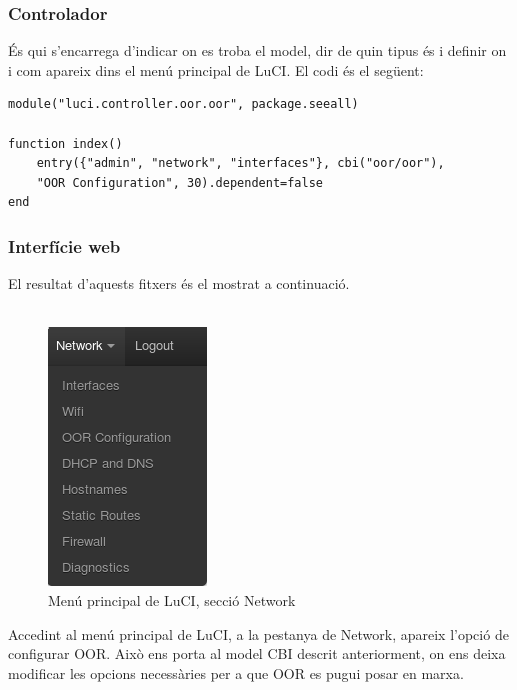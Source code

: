 \documentclass[11pt]{article}
\begin{document}
\subsubsection{Controlador}
És qui s’encarrega d’indicar on es troba el model, dir de quin tipus és i definir on i com apareix dins el menú principal de LuCI. El codi és el següent:\\
\lstset{caption=Controlador de la interfície LuCI}
\begin{lstlisting}[frame=single]
module("luci.controller.oor.oor", package.seeall)

function index()
    entry({"admin", "network", "interfaces"}, cbi("oor/oor"),
	"OOR Configuration", 30).dependent=false
end
\end{lstlisting}
\newpage
\subsubsection{Interfície web}
El resultat d’aquests fitxers és el mostrat a continuació. \\
\\
	\begin{figure}[h]
		\centering
		\includegraphics[scale=0.75]{luci1}
		\caption{Menú principal de LuCI, secció Network}
	\end{figure}	
	
Accedint al menú principal de LuCI, a la pestanya de Network, apareix l’opció de configurar OOR. Això ens porta al model CBI descrit anteriorment, on ens deixa modificar les opcions necessàries per a que OOR es pugui posar en marxa.\\
\end{document}
